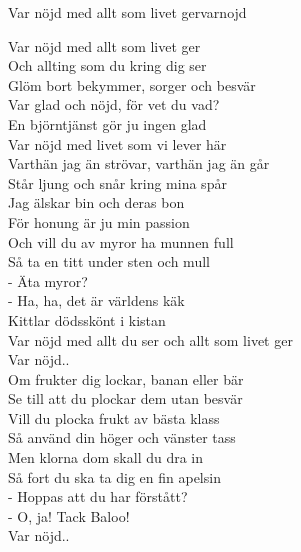 \begin{song}{Var nöjd med allt som livet ger}{varnojd}
\begin{vers}
Var nöjd med allt som livet ger \\
Och allting som du kring dig ser\\
Glöm bort bekymmer, sorger och besvär\\
Var glad och nöjd, för vet du vad? \\
En björntjänst gör ju ingen glad\\
Var nöjd med livet som vi lever här\\
Varthän jag än strövar, varthän jag än går \\
Står ljung och snår kring mina spår\\
Jag älskar bin och deras bon\\
För honung är ju min passion\\
Och vill du av myror ha munnen full \\
Så ta en titt under sten och mull\\
- Äta myror?\\
- Ha, ha, det är världens käk\\
Kittlar dödsskönt i kistan\\
Var nöjd med allt du ser och allt som livet ger\\
Var nöjd..\\
Om frukter dig lockar, banan eller bär\\
Se till att du plockar dem utan besvär\\
Vill du plocka frukt av bästa klass \\
Så använd din höger och vänster tass\\
Men klorna dom skall du dra in\\
Så fort du ska ta dig en fin apelsin\\
- Hoppas att du har förstått?\\
- O, ja! Tack Baloo!\\
Var nöjd..\\
\end{vers}
\end{song}
